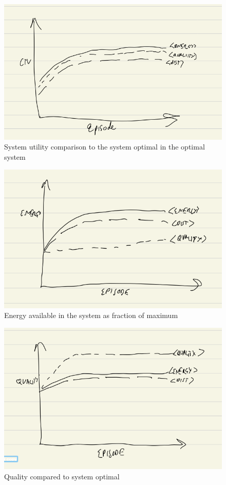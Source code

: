 
\begin{figure}[ht]
	\centering
	\includegraphics[width=0.8\linewidth]{5_ewsn_ctv}
	\captionsetup{labelfont=bf,singlelinecheck=on}
	\caption{System utility comparison to the system optimal in the optimal system}
	\label{fig:5_ewsn_ctv}
\end{figure}
\begin{figure}[ht]
	\centering
	\includegraphics[width=0.8\linewidth]{5_ewsn_energy}
	\captionsetup{labelfont=bf,singlelinecheck=on}
	\caption{Energy available in the system as fraction of maximum}
	\label{fig:5_ewsn_energy}
\end{figure}
\begin{figure}[ht]
	\centering
	\includegraphics[width=0.8\linewidth]{5_ewsn_quality}
	\captionsetup{labelfont=bf,singlelinecheck=on}
	\caption{Quality compared to system optimal}
	\label{fig:5_ewsn_quality}
\end{figure}

